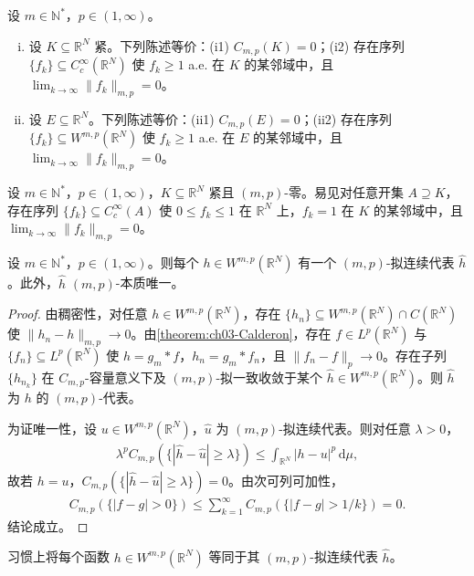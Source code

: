 \documentclass[../../main.tex]{subfiles}%
\begin{document}
\begin{proposition}\label{proposition:ch03-mp零集}\label{proposition:ch03-零容量逼近}
设 $m\in\mathbb{N}^*$，$p\in(1,\infty)$。
\begin{enumerate}[(i)]
\item 设 $K\subseteq\mathbb{R}^N$ 紧。下列陈述等价：(i1) $C_{m,p}(K)=0$；(i2) 存在序列 $\{f_k\}\subseteq C^\infty_c(\mathbb{R}^N)$ 使 $f_k\geqslant1$ a.e. 在 $K$ 的某邻域中，且 $\lim_{k\to\infty}\|f_k\|_{m,p}=0$。
\item 设 $E\subseteq\mathbb{R}^N$。下列陈述等价：(ii1) $C_{m,p}(E)=0$；(ii2) 存在序列 $\{f_k\}\subseteq W^{m,p}(\mathbb{R}^N)$ 使 $f_k\geqslant1$ a.e. 在 $E$ 的某邻域中，且 $\lim_{k\to\infty}\|f_k\|_{m,p}=0$。
\end{enumerate}
\end{proposition}

\begin{remark}\label{remark:ch03-零集磨光}
\label{remark:ch03-磨光注}
设 $m\in\mathbb{N}^*$，$p\in(1,\infty)$，$K\subseteq\mathbb{R}^N$ 紧且 $(m,p)$-零。易见对任意开集 $A\supseteq K$，存在序列 $\{f_k\}\subseteq C^\infty_c(A)$ 使 $0\leqslant f_k\leqslant1$ 在 $\mathbb{R}^N$ 上，$f_k=1$ 在 $K$ 的某邻域中，且 $\lim_{k\to\infty}\|f_k\|_{m,p}=0$。
\end{remark}

\begin{theorem}\label{theorem:ch03-拟连续代表}
设 $m\in\mathbb{N}^*$，$p\in(1,\infty)$。则每个 $h\in W^{m,p}(\mathbb{R}^N)$ 有一个 $(m,p)$-拟连续代表 $\widehat h$。此外，$\widehat h$ $(m,p)$-本质唯一。
\end{theorem}

\begin{proof}
由稠密性，对任意 $h\in W^{m,p}(\mathbb{R}^N)$，存在 $\{h_n\}\subseteq W^{m,p}(\mathbb{R}^N)\cap C(\mathbb{R}^N)$ 使 $\|h_n-h\|_{m,p}\to0$。由\cref{theorem:ch03-Calderon}，存在 $f\in L^p(\mathbb{R}^N)$ 与 $\{f_n\}\subseteq L^p(\mathbb{R}^N)$ 使 $h=g_m*f$，$h_n=g_m*f_n$，且 $\|f_n-f\|_p\to0$。存在子列 $\{h_{n_k}\}$ 在 $C_{m,p}$-容量意义下及 $(m,p)$-拟一致收敛于某个 $\widehat h\in W^{m,p}(\mathbb{R}^N)$。则 $\widehat h$ 为 $h$ 的 $(m,p)$-代表。

为证唯一性，设 $u\in W^{m,p}(\mathbb{R}^N)$，$\widehat u$ 为 $(m,p)$-拟连续代表。则对任意 $\lambda>0$，
\begin{align*}
\lambda^p C_{m,p}(\{|\widehat h-\widehat u|\geqslant\lambda\})\leqslant\int_{\mathbb{R}^N}|h-u|^p\,\mathrm{d}\mu,
\end{align*}
故若 $h=u$，$C_{m,p}(\{|\widehat h-\widehat u|\geqslant\lambda\})=0$。由次可列可加性，
\begin{align*}
C_{m,p}(\{|f-g|>0\})\leqslant\sum_{k=1}^\infty C_{m,p}(\{|f-g|>1/k\})=0.
\end{align*}
结论成立。
\end{proof}

\begin{remark}\label{remark:ch03-等同拟连续}
习惯上将每个函数 $h\in W^{m,p}(\mathbb{R}^N)$ 等同于其 $(m,p)$-拟连续代表 $\widehat h$。
\end{remark}
\end{document}
